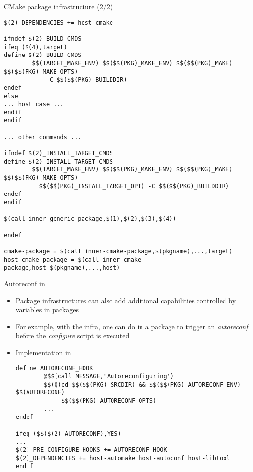 \begin{frame}[fragile]{CMake package infrastructure (2/2)}

\begin{block}{}
\begin{verbatim}
$(2)_DEPENDENCIES += host-cmake

ifndef $(2)_BUILD_CMDS
ifeq ($(4),target)
define $(2)_BUILD_CMDS
        $$(TARGET_MAKE_ENV) $$($$(PKG)_MAKE_ENV) $$($$(PKG)_MAKE) $$($$(PKG)_MAKE_OPTS)
            -C $$($$(PKG)_BUILDDIR)
endef
else
... host case ...
endif
endif

... other commands ...

ifndef $(2)_INSTALL_TARGET_CMDS
define $(2)_INSTALL_TARGET_CMDS
        $$(TARGET_MAKE_ENV) $$($$(PKG)_MAKE_ENV) $$($$(PKG)_MAKE) $$($$(PKG)_MAKE_OPTS)
          $$($$(PKG)_INSTALL_TARGET_OPT) -C $$($$(PKG)_BUILDDIR)
endef
endif

$(call inner-generic-package,$(1),$(2),$(3),$(4))

endef

cmake-package = $(call inner-cmake-package,$(pkgname),...,target)
host-cmake-package = $(call inner-cmake-package,host-$(pkgname),...,host)
\end{verbatim}
\end{block}

\end{frame}

\begin{frame}[fragile]{Autoreconf in }
  \begin{itemize}
  \item Package infrastructures can also add additional capabilities
    controlled by variables in packages
  \item For example, with the  infra, one can
    do  in a package to trigger an {\em
      autoreconf} before the {\em configure} script is executed
  \item Implementation in 
    \begin{block}{}
      \begin{verbatim}
define AUTORECONF_HOOK
        @$$(call MESSAGE,"Autoreconfiguring")
        $$(Q)cd $$($$(PKG)_SRCDIR) && $$($$(PKG)_AUTORECONF_ENV) $$(AUTORECONF)
             $$($$(PKG)_AUTORECONF_OPTS)
        ...
endef

ifeq ($$($(2)_AUTORECONF),YES)
...
$(2)_PRE_CONFIGURE_HOOKS += AUTORECONF_HOOK
$(2)_DEPENDENCIES += host-automake host-autoconf host-libtool
endif
      \end{verbatim}
    \end{block}
  \end{itemize}
\end{frame}

